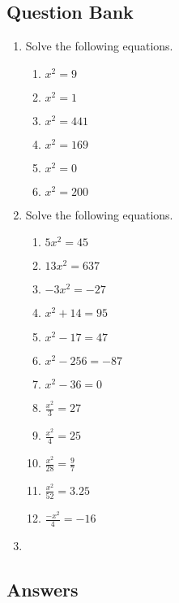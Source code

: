 \documentclass[a4paper,12pt]{article}
\begin{document}
\newpage
\subsection*{Question Bank}

\begin{enumerate}
\item Solve the following equations.
    \begin{multicols}{2}
    \begin{enumerate}
    \item $x^2 = 9$
    \item $x^2 = 1$
    \item $x^2 = 441$
    \item $x^2 = 169$
    \item $x^2 = 0$
    \item $x^2 = 200$
    \end{enumerate}
    \end{multicols}
\item Solve the following equations.
    \begin{multicols}{2}
    \begin{enumerate}
    \item $5x^2 = 45$
    \item $13x^2 = 637$
    \item $-3x^2 = -27$
    \item $x^2 + 14 = 95$
    \item $x^2 - 17 = 47$
    \item $x^2 - 256 = -87$
    \item $x^2 - 36 = 0$
    \item $\displaystyle\frac{x^2}{3} = 27$
    \item $\displaystyle\frac{x^2}{4} = 25$
    \item $\displaystyle\frac{x^2}{28} = \frac{9}{7}$
    \item $\displaystyle\frac{x^2}{52} = 3.25$
    \item $\displaystyle\frac{-x^2}{4} = -16$
    \end{enumerate}
    \end{multicols}
\item 
\end{enumerate}

\newpage
\subsection*{Answers}
\end{document}
